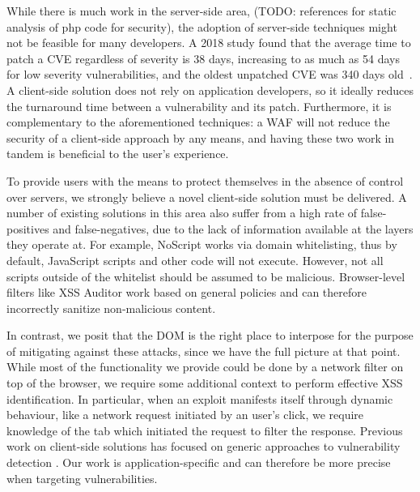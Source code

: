 While there is much work in the server-side area,
\cite{Xu:2006:TPE:1267336.1267345,DBLP:conf/sec/Nguyen-TuongGGSE05,Pietraszek:2005:DAI:2146257.2146267,Bisht:2008:XPD:1428322.1428325}
(TODO: references for static analysis of php code for security), the
adoption of server-side techniques might not be feasible for many
developers. A 2018 study found that the average time to patch a \ac{CVE}
regardless of severity is 38 days, increasing to as much as 54 days
for low severity vulnerabilities, and the oldest unpatched \ac{CVE} was 340
days old~\cite{Rapid7}. A client-side solution does not rely on
application developers, so it ideally reduces the turnaround time
between a vulnerability and its patch. Furthermore, it is
complementary to the aforementioned techniques: a \ac{WAF} will not reduce
the security of a client-side approach by any means, and having these
two work in tandem is beneficial to the user's experience.

To provide users with the means to protect themselves in the absence
of control over servers, we strongly believe a novel client-side
solution must be delivered. A number of existing solutions in this
area also suffer from a high rate of false-positives and
false-negatives, due to the lack of information available at the
layers they operate at. For example, NoScript works via domain
whitelisting, thus by default, JavaScript scripts and other code will
not execute. However, not all scripts outside of the whitelist should
be assumed to be malicious. Browser-level filters like XSS Auditor
work based on general policies and can therefore incorrectly sanitize
non-malicious content.

In contrast, we posit that the DOM is the right place to interpose for
the purpose of mitigating against these attacks, since we have the
full picture at that point. While most of the functionality we provide
could be done by a network filter on top of the browser, we require
some additional context to perform effective \ac{XSS} identification. In
particular, when an exploit manifests itself through dynamic
behaviour, like a network request initiated by an user's click, we
require knowledge of the tab which initiated the request to filter the
response. Previous work on client-side solutions has focused on
generic approaches to vulnerability detection
\cite{Kirda:2009:CCS:2639535.2639808,Jim:2007:DSI:1242572.1242654,Hallaraker:2005:DMJ:1078029.1078861}. Our
work is application-specific and can therefore be more precise when
targeting vulnerabilities.

